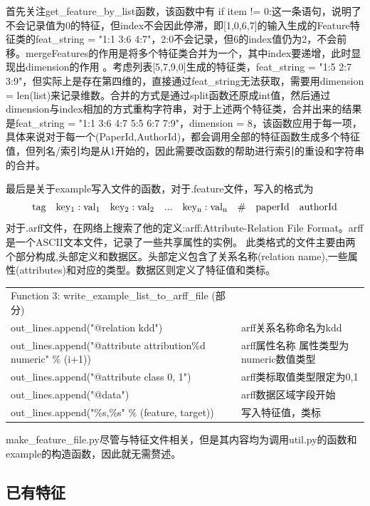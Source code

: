 \documentclass{mcmthesis}
\begin{document}
		\par 首先关注get\_feature\_by\_list函数，该函数中有 if item != 0:这一条语句，说明了不会记录值为0的特征，但index不会因此停滞，即[1,0,6,7]的输入生成的Feature特征类的feat\_string = "1:1 3:6 4:7"，2:0不会记录，但6的index值仍为2，不会前移。mergeFeatures的作用是将多个特征类合并为一个，其中index要递增，此时显现出dimension的作用 。考虑列表[5,7,9,0]生成的特征类，feat\_string = "1:5 2:7 3:9"，但实际上是存在第四维的，直接通过feat\_string无法获取，需要用dimension = len(list)来记录维数。合并的方式是通过split函数还原成int值，然后通过dimension与index相加的方式重构字符串，对于上述两个特征类，合并出来的结果是feat\_string = "1:1 3:6 4:7 5:5 6:7 7:9"，dimension = 8，该函数应用于每一项，具体来说对于每一个(PaperId,AuthorId)，都会调用全部的特征函数生成多个特征值，但列名/索引均是从1开始的，因此需要改函数的帮助进行索引的重设和字符串的合并。
		
		\par 最后是关于example写入文件的函数，对于.feature文件，写入的格式为
		$$ \rm tag \quad key_1:val_1 \quad key_2:val_2 \quad ... \quad key_n:val_n \quad \# \quad paperId \quad authorId $$
		对于.arff文件，在网络上搜索了他的定义:arff:Attribute-Relation File Format。arff是一个ASCII文本文件，记录了一些共享属性的实例。
		此类格式的文件主要由两个部分构成,头部定义和数据区。头部定义包含了关系名称(relation name),一些属性(attributes)和对应的类型。数据区则定义了特征值和类标。
		\hspace*{\fill} \\
		\begin{tabular}{ll}
			\hline
			Function 3: write\_example\_list\_to\_arff\_file (部分) & \\
			out\_lines.append("@relation kdd")  & arff关系名称命名为kdd \\
			out\_lines.append("@attribute attribution\%d numeric" \% (i+1)) & arff属性名称 属性类型为numeric数值类型 \\
			out\_lines.append("@attribute class {0, 1}") & arff类标取值类型限定为{0,1} \\
			out\_lines.append("@data")  & arff数据区域字段开始 \\
			out\_lines.append("\%s,\%s" \% (feature, target)) & 写入特征值，类标 \\
			\hline
		\end{tabular}
		\par make\_feature\_file.py尽管与特征文件相关，但是其内容均为调用util.py的函数和example的构造函数，因此就无需赘述。
	\subsection{已有特征}
\end{document}
